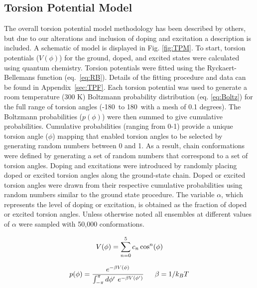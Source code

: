 \subsection{Torsion Potential Model} The overall torsion potential model methodology has been described by others,\cite{Zhang2014, Claudio2001} but due to our alterations and inclusion of doping and excitation a description is included. A schematic of model is displayed in Fig. \ref{fig:TPM}. To start, torsion potentials ($V(\phi)$) for the ground, doped, and excited states were calculated using quantum chemistry. Torsion potentials were fitted using the Ryckaert-Bellemans function (eq.~\ref{eq:RB}). Details of the fitting procedure and data can be found in Appendix~\ref{sec:TPF}. Each torsion potential was used to generate a room temperature (300 K) Boltzmann probability distribution (eq. \ref{eq:Boltz}) for the full range of torsion angles (-180\textdegree \ to 180\textdegree \ with a mesh of 0.1 degrees). The Boltzmann probabilities ($p(\phi)$) were then summed to give cumulative probabilities. Cumulative probabilities (ranging from 0-1) provide a unique torsion angle ($\phi$) mapping that enabled torsion angles to be selected by generating random numbers between 0 and 1. As a result, chain conformations were defined by generating a set of random numbers that correspond to a set of torsion angles. Doping and excitations were introduced by randomly placing doped or excited torsion angles along the ground-state chain. Doped or excited torsion angles were drawn from their respective cumulative probabilities using random numbers similar to the ground state procedure. The variable $\alpha$, which represents the level of doping or excitation, is obtained as the fraction of doped or excited torsion angles. Unless otherwise noted all ensembles at different values of $\alpha$ were sampled with 50,000 conformations.

\begin{equation}
\label{eq:RB}
\large
V(\phi) = \sum_{n=0}^{5} c_n \cos^n(\phi)
\end{equation}

\begin{equation}
\label{eq:Boltz}
\large
p(\phi) = \frac{e^{-\beta V(\phi)}}{\int_{-\pi}^{\pi} d\phi' \ e^{-\beta V(\phi')}} \ \ \ \ \beta = 1/k_BT
\end{equation}

